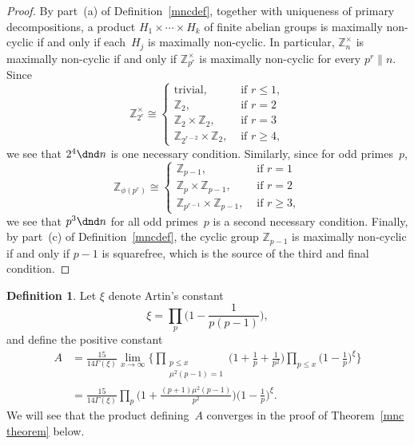 \documentclass[12pt,reqno]{amsart}
\theoremstyle{definition}
\newtheorem{definition}[theorem]{Definition}
\newcommand{\Z}{{\mathbb Z}}
\begin{document}
\begin{proof}
By part~(a) of Definition~\ref{mncdef}, together with uniqueness of primary decompositions, a product $H_1\times\cdots\times H_k$ of finite abelian groups is maximally non-cyclic if and only if each~$H_j$ is maximally non-cyclic. In particular, $\Z_n^\times$ is maximally non-cyclic if and only if $\Z_{p^r}^\times$ is maximally non-cyclic for every $p^r\| n$. Since
\begin{equation*}
\Z_{2^r}^\times \cong \begin{cases}
\text{trivial},  &\text{ if } r\le1,\\
\Z_2,  &\text{ if } r=2\\
\Z_2\times \Z_2,  &\text{ if } r=3\\
\Z_{2^{r-2}}\times \Z_2,  &\text{ if } r\ge 4,
\end{cases}
\end{equation*}
we see that $2^4\dnd n$ is one necessary condition. Similarly, since for odd primes~$p$,
\begin{equation*}
\Z_{\phi(p^r)} \cong \begin{cases}
\Z_{p-1}, &\text{ if } r=1\\
\Z_p\times \Z_{p-1},  &\text{ if } r=2\\
\Z_{p^{r-1}}\times\Z_{p-1},  &\text{ if } r\ge 3,
\end{cases}
\end{equation*}
we see that $p^3\dnd n$ for all odd primes~$p$ is a second necessary condition. Finally, by part~(c) of Definition~\ref{mncdef}, the cyclic group $\Z_{p-1}$ is maximally non-cyclic if and only if $p-1$ is squarefree, which is the source of the third and final condition.
\end{proof}

\begin{definition}\label{Artin}
Let $\xi$ denote Artin's constant
\[
\xi=\prod_p \bigg(1-\frac 1{p(p-1)}\bigg),
\]
and define the positive constant
\begin{align*}
A &= \frac {15}{14\Gamma(\xi)}\lim_{x\to\infty}\bigg\{ \prod_{\substack{p\le x\\\mu^2(p-1)=1}}\bigg(1+\frac 1p+\frac 1{p^2}\bigg) \prod_{p\le x}\bigg(1-\frac 1p\bigg)^\xi\bigg\} \\
&= \frac {15}{14\Gamma(\xi)} \prod_p \bigg(1+\frac{(p+1)\mu^2(p-1)}{p^2}\bigg) \bigg(1-\frac 1p\bigg)^\xi.
\end{align*}
We will see that the product defining~$A$ converges in the proof of Theorem~\ref{mnc theorem} below.
\end{definition}
\end{document}
